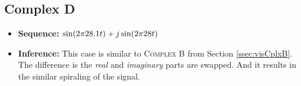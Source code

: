 \documentclass[../../course]{subfiles}
\begin{document}
\subsection{Complex D} \label{ssec:visCplxD}

\begin{itemize} [label=]

    \item \textbf{Sequence:} $\sin(2 \pi 28.1 t) + j \sin(2 \pi 28 t)$

    \item \textbf{Inference:} This case is similar to \textsc{Complex B} from Section
        \ref{ssec:visCplxB}. The difference is the \emph{real} and \emph{imaginary} parts
        are swapped. And it results in the similar spiraling of the signal.

\end{itemize}

\vfill
\end{document}
